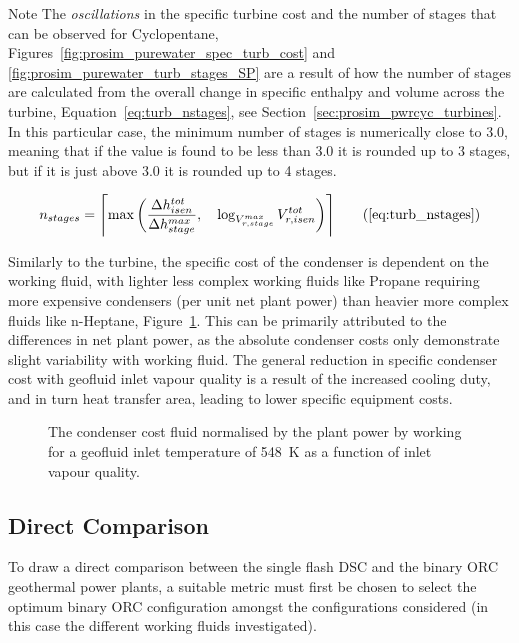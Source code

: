     \begin{notes}{Note}
        The \emph{oscillations} in the specific turbine cost and the number of stages that can be observed for Cyclopentane, Figures~\ref{fig:prosim_purewater_spec_turb_cost} and \ref{fig:prosim_purewater_turb_stages_SP} are a result of how the number of stages are calculated from the overall change in specific enthalpy and volume across the turbine, Equation~\ref{eq:turb_nstages}, see Section~\ref{sec:prosim_pwrcyc_turbines}. In this particular case, the minimum number of stages is numerically close to \num{3.0}, meaning that if the value is found to be less than \num{3.0} it is rounded up to \num{3} stages, but if it is just above \num{3.0} it is rounded up to \num{4} stages.

        \begin{align}
            n_{stages}= \Biggl \lceil \max \left( \frac{\Delta h_{isen}^{tot}}{\Delta h_{stage}^{max}} , \quad \log_{V_{r, stage}^{max}} V_{r, isen}^{tot} \right) \Biggr \rceil \tag{\ref{eq:turb_nstages}}
        \end{align}

        
    \end{notes}

    Similarly to the turbine, the specific cost of the condenser is dependent on the working fluid, with lighter less complex working fluids like Propane requiring more expensive condensers (per unit net plant power) than heavier more complex fluids like n-Heptane, Figure~\ref{fig:prosim_purewater_spec_cond_cost}. This can be primarily attributed to the differences in net plant power, as the absolute condenser costs only demonstrate slight variability with working fluid. The general reduction in specific condenser cost with geofluid inlet vapour quality is a result of the increased cooling duty, and in turn heat transfer area, leading to lower specific equipment costs. 

    \begin{figure}[H]
        \centering
        
        \caption{The condenser cost fluid normalised by the plant power by working for a geofluid inlet temperature of \qty{548}{\K} as a function of inlet vapour quality.}
        \label{fig:prosim_purewater_spec_cond_cost}
    \end{figure}

\subsection{Direct Comparison}
    \label{sec:thermo_opt_direc_comp}
    To draw a direct comparison between the single flash \ac{DSC} and the binary \ac{ORC} geothermal power plants, a suitable metric must first be chosen to select the optimum binary \ac{ORC} configuration amongst the configurations considered (in this case the different working fluids investigated). 
    
